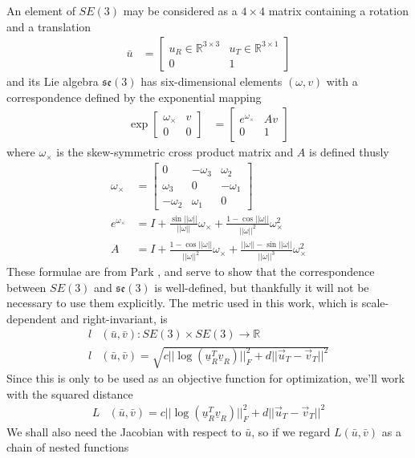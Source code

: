 \documentclass[letterpaper, 10 pt, conference]{ieeeconf}  %
\newcommand\mat[2]{\ensuremath{\left[\begin{array}{#1}#2\end{array}\right]}}
\begin{document}
An element of $SE(3)$ may be considered as a $4 \times 4$ matrix containing a rotation and a translation
\begin{align}
  \bar{u} &= \mat{c|c}{ u_R \in \mathbb{R}^{3 \times 3} & u_T \in \mathbb{R}^{3 \times 1} \\\hline 0 & 1 }
\end{align}
and its Lie algebra $\mathfrak{se}(3)$ has six-dimensional elements $(\omega, v)$ with a correspondence defined by the exponential mapping
\begin{align}
  \exp{\mat{c|c}{ \omega_\times & v \\\hline 0 & 0 }} &= \mat{c|c}{ e^{\omega_\times} & Av \\\hline 0 & 1}
\end{align}
where $\omega_\times$ is the skew-symmetric cross product matrix and $A$ is defined thusly
\begin{align}
  \omega_\times &= \mat{ccc}{ 0 & -\omega_3 & \omega_2 \\ \omega_3 & 0 & -\omega_1 \\ -\omega_2 & \omega_1 & 0 } \\
  e^{\omega_\times} &= I + \frac{\sin||\omega||}{||\omega||} \omega_\times + \frac{1 - \cos{||\omega||}}{||\omega||^2} \omega_\times^2 \\
  A &= I + \frac{1 - \cos{||\omega||}}{||\omega||^2} \omega_\times + \frac{||\omega|| - \sin{||\omega||}}{||\omega||^3} \omega_\times^2
\end{align}
These formulae are from Park \cite{Park1995}, and serve to show that the correspondence between $SE(3)$ and $\mathfrak{se}(3)$ is well-defined, but thankfully it will not be necessary to use them explicitly. The metric used in this work, which is scale-dependent and right-invariant, is
\begin{align}
  l&(\bar{u},\bar{v}) : SE(3) \times SE(3) \longrightarrow \mathbb{R} \\
  l&(\bar{u},\bar{v}) = \sqrt{c ||\log(\underline{u}_R^T \underline{v}_R)||_F^2 + d ||\vec{u}_T - \vec{v}_T||^2} \nonumber
\end{align}
Since this is only to be used as an objective function for optimization, we'll work with the squared distance
\begin{align}
  L&(\bar{u},\bar{v}) = c ||\log(\underline{u}_R^T \underline{v}_R)||_F^2 + d ||\vec{u}_T - \vec{v}_T||^2
\end{align}
We shall also need the Jacobian with respect to $\bar{u}$, so if we regard $L(\bar{u},\bar{v})$ as a chain of nested functions
\end{document}

